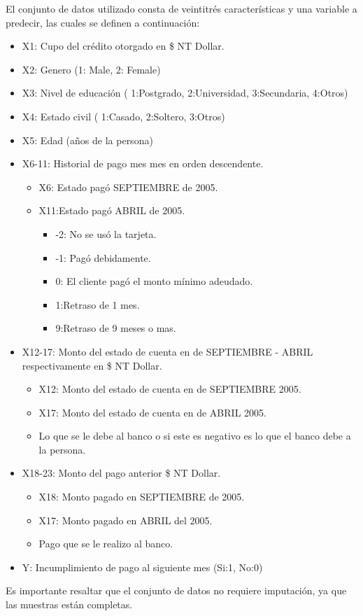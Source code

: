 \documentclass[conference]{IEEEtran}
\begin{document}
El conjunto de datos utilizado consta de veintitrés características y una variable a predecir, las cuales se definen a continuación: 
\\
\begin{itemize}
    \item X1: Cupo del crédito otorgado en \$ NT Dollar. 
    \item X2: Genero (1: Male, 2: Female)
    \item X3: Nivel de educación ( 1:Postgrado, 2:Universidad, 3:Secundaria, 4:Otros)
    \item X4: Estado civil ( 1:Casado, 2:Soltero, 3:Otros)
    \item X5: Edad (años de la persona)
    \item X6-11: Historial de pago mes  mes en orden descendente.
        \begin{itemize}
            \item X6: Estado pagó SEPTIEMBRE de 2005.
            \item X11:Estado pagó ABRIL de 2005.
             \begin{itemize}
                \item -2: No se usó la tarjeta.
                \item -1: Pagó debidamente.
                \item  0: El cliente pagó el monto mínimo adeudado.
                \item  1:Retraso de 1 mes.
                \item  9:Retraso de 9 meses o mas.
             \end{itemize}
         \end{itemize}
    \item X12-17: Monto del estado de cuenta en de SEPTIEMBRE - ABRIL respectivamente en \$ NT Dollar.
    \begin{itemize}
            \item X12: Monto del estado de cuenta en de SEPTIEMBRE 2005.
            \item X17: Monto del estado de cuenta en de ABRIL 2005.
            \item Lo que se le debe al banco o si este es negativo es lo que el banco debe a la persona.
         \end{itemize}
    \item X18-23: Monto del pago anterior \$ NT Dollar.
        \begin{itemize}
            \item X18: Monto pagado en SEPTIEMBRE de 2005.
            \item X17: Monto pagado en ABRIL del 2005.
            \item Pago que se le realizo al banco.
         \end{itemize}
    \item Y: Incumplimiento de pago al siguiente mes (Si:1, No:0)\\
\end{itemize}
Es importante resaltar que el conjunto de datos no requiere imputación, ya que las muestras están completas. 
\end{document}
